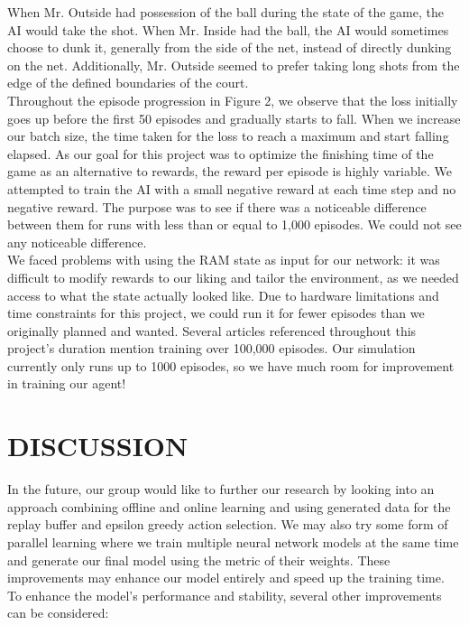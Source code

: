\documentclass[letterpaper, 10 pt, conference]{ieeeconf}
\begin{document}
When Mr. Outside had possession of the ball during the state of the game, the AI would take the shot. When Mr. Inside had the ball, the AI would sometimes choose to dunk it, generally from the side of the net, instead of directly dunking on the net. Additionally, Mr. Outside seemed to prefer taking long shots from the edge of the defined boundaries of the court. \\

Throughout the episode progression in Figure 2, we observe that the loss initially goes up before the first 50 episodes and gradually starts to fall. When we increase our batch size, the time taken for the loss to reach a maximum and start falling elapsed. As our goal for this project was to optimize the finishing time of the game as an alternative to rewards, the reward per episode is highly variable. We attempted to train the AI with a small negative reward at each time step and no negative reward. The purpose was to see if there was a noticeable difference between them for runs with less than or equal to 1,000 episodes. We could not see any noticeable difference. \\

We faced problems with using the RAM state as input for our network: it was difficult to modify rewards to our liking and tailor the environment, as we needed access to what the state actually looked like. Due to hardware limitations and time constraints for this project, we could run it for fewer episodes than we originally planned and wanted. Several articles referenced throughout this project's duration mention training over 100,000 episodes. Our simulation currently only runs up to 1000 episodes, so we have much room for improvement in training our agent!\\

\section{\textbf{DISCUSSION}}
\vspace{.5cm}
In the future, our group would like to further our research by looking into an approach combining offline and online learning and using generated data for the replay buffer and epsilon greedy action selection. We may also try some form of parallel learning where we train multiple neural network models at the same time and generate our final model using the metric of their weights. These improvements may enhance our model entirely and speed up the training time. To enhance the model's performance and stability, several other improvements can be considered: \\
\end{document}

